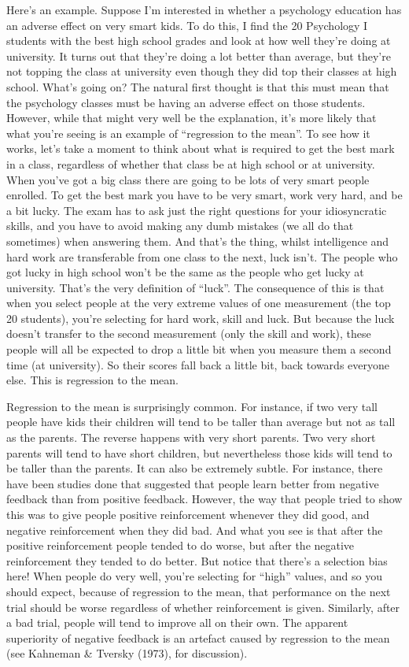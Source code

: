 \documentclass[
  a4paper,
]{book}
\begin{document}
Here's an example. Suppose I'm interested in whether a psychology
education has an adverse effect on very smart kids. To do this, I find
the 20 Psychology I students with the best high school grades and look
at how well they're doing at university. It turns out that they're doing
a lot better than average, but they're not topping the class at
university even though they did top their classes at high school. What's
going on? The natural first thought is that this must mean that the
psychology classes must be having an adverse effect on those students.
However, while that might very well be the explanation, it's more likely
that what you're seeing is an example of ``regression to the mean''. To
see how it works, let's take a moment to think about what is required to
get the best mark in a class, regardless of whether that class be at
high school or at university. When you've got a big class there are
going to be lots of very smart people enrolled. To get the best mark you
have to be very smart, work very hard, and be a bit lucky. The exam has
to ask just the right questions for your idiosyncratic skills, and you
have to avoid making any dumb mistakes (we all do that sometimes) when
answering them. And that's the thing, whilst intelligence and hard work
are transferable from one class to the next, luck isn't. The people who
got lucky in high school won't be the same as the people who get lucky
at university. That's the very definition of ``luck''. The consequence
of this is that when you select people at the very extreme values of one
measurement (the top 20 students), you're selecting for hard work, skill
and luck. But because the luck doesn't transfer to the second
measurement (only the skill and work), these people will all be expected
to drop a little bit when you measure them a second time (at
university). So their scores fall back a little bit, back towards
everyone else. This is regression to the mean.

Regression to the mean is surprisingly common. For instance, if two very
tall people have kids their children will tend to be taller than average
but not as tall as the parents. The reverse happens with very short
parents. Two very short parents will tend to have short children, but
nevertheless those kids will tend to be taller than the parents. It can
also be extremely subtle. For instance, there have been studies done
that suggested that people learn better from negative feedback than from
positive feedback. However, the way that people tried to show this was
to give people positive reinforcement whenever they did good, and
negative reinforcement when they did bad. And what you see is that after
the positive reinforcement people tended to do worse, but after the
negative reinforcement they tended to do better. But notice that there's
a selection bias here! When people do very well, you're selecting for
``high'' values, and so you should expect, because of regression to the
mean, that performance on the next trial should be worse regardless of
whether reinforcement is given. Similarly, after a bad trial, people
will tend to improve all on their own. The apparent superiority of
negative feedback is an artefact caused by regression to the mean (see
Kahneman \& Tversky (1973), for discussion).
\end{document}
